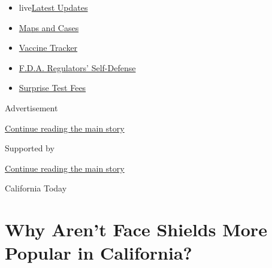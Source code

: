\begin{itemize}
\tightlist
\item
  live\href{https://www.nytimes3xbfgragh.onion/2020/09/11/world/covid-19-coronavirus.html?name=styln-coronavirus-national\&region=TOP_BANNER\&block=storyline_menu_recirc\&action=click\&pgtype=Article\&impression_id=298108e1-f4bd-11ea-9f52-359fb3db6407\&variant=undefined}{Latest
  Updates}
\item
  \href{https://www.nytimes3xbfgragh.onion/interactive/2020/us/coronavirus-us-cases.html?name=styln-coronavirus-national\&region=TOP_BANNER\&block=storyline_menu_recirc\&action=click\&pgtype=Article\&impression_id=298108e2-f4bd-11ea-9f52-359fb3db6407\&variant=undefined}{Maps
  and Cases}
\item
  \href{https://www.nytimes3xbfgragh.onion/interactive/2020/science/coronavirus-vaccine-tracker.html?name=styln-coronavirus-national\&region=TOP_BANNER\&block=storyline_menu_recirc\&action=click\&pgtype=Article\&impression_id=298108e3-f4bd-11ea-9f52-359fb3db6407\&variant=undefined}{Vaccine
  Tracker}
\item
  \href{https://www.nytimes3xbfgragh.onion/2020/09/10/us/politics/fda-coronavirus-vaccine.html?name=styln-coronavirus-national\&region=TOP_BANNER\&block=storyline_menu_recirc\&action=click\&pgtype=Article\&impression_id=298108e4-f4bd-11ea-9f52-359fb3db6407\&variant=undefined}{F.D.A.
  Regulators' Self-Defense}
\item
  \href{https://www.nytimes3xbfgragh.onion/2020/09/09/upshot/coronavirus-surprise-test-fees.html?name=styln-coronavirus-national\&region=TOP_BANNER\&block=storyline_menu_recirc\&action=click\&pgtype=Article\&impression_id=298108e5-f4bd-11ea-9f52-359fb3db6407\&variant=undefined}{Surprise
  Test Fees}
\end{itemize}

Advertisement

\protect\hyperlink{after-top}{Continue reading the main story}

Supported by

\protect\hyperlink{after-sponsor}{Continue reading the main story}

California Today

\hypertarget{why-arent-face-shields-more-popular-in-california}{%
\section{Why Aren't Face Shields More Popular in
California?}\label{why-arent-face-shields-more-popular-in-california}}

